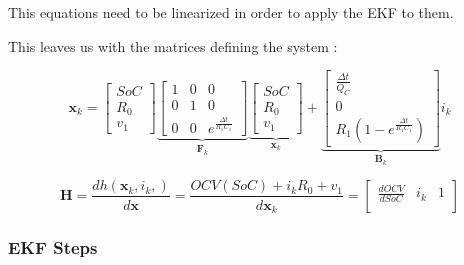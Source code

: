 
This equations need to be linearized in order to apply the EKF to them. 

This leaves us with the matrices defining the system : 

\begin{equation}
 \boldsymbol x_k = 
  \begin{bmatrix}
  SoC \\
  R_0 \\
  v_1
  \end{bmatrix}   
 \underbrace{  
 \begin{bmatrix}
 1 & 0 & 0\\
 0 & 1 & 0\\
 0 & 0 & e^\frac{\Delta t}{R_1 C_1}
 \end{bmatrix}}_{\boldsymbol F_k}
 \underbrace{ 
 \begin{bmatrix}
 SoC \\
 R_0 \\
 v_1
 \end{bmatrix}}_{\boldsymbol x_k}  
 +
 \underbrace{
 \begin{bmatrix}
 \frac{\Delta t}{Q_C} \\
 0 \\
 R_1 (1-e^\frac{\Delta t}{R_1 C_1})
 \end{bmatrix}}_{\boldsymbol B_k}  i_k  
\end{equation}

\begin{equation}
\boldsymbol H = \frac{dh({\boldsymbol {x}}_{k}, {i}_{k},)} {d \boldsymbol {x}}  =  \frac{OCV(SoC) + i_k R_0  +  v_1}{d\boldsymbol {x}_{k}} = 
\begin{bmatrix}
 \frac{dOCV}{dSoC} &  i_k  & 1\\
\end{bmatrix}
\end{equation}

\subsubsection{EKF Steps}

